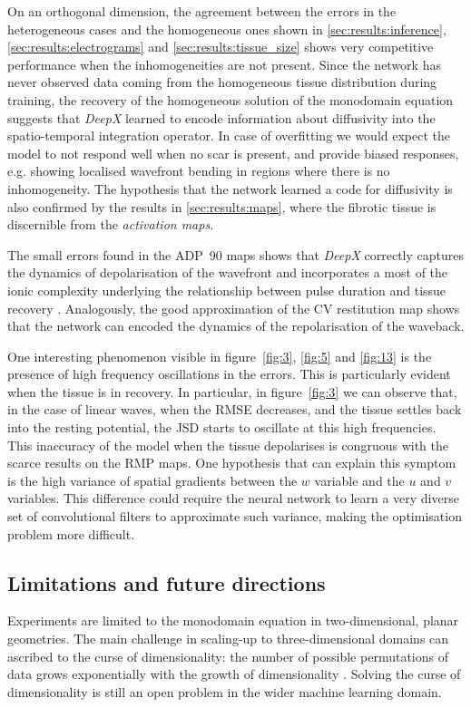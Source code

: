 \documentclass[utf8]{frontiersSCNS} %
\begin{document}
On an orthogonal dimension, the agreement between the errors in the heterogeneous cases and the homogeneous ones shown in \ref{sec:results:inference}, \ref{sec:results:electrograms} and \ref{sec:results:tissue_size} shows very competitive performance when the inhomogeneities are not present.
Since the network has never observed data coming from the homogeneous tissue distribution during training, the recovery of the homogeneous solution of the monodomain equation suggests that \textit{DeepX} learned to encode information about diffusivity into the spatio-temporal integration operator.
In case of overfitting we would expect the model to not respond well when no scar is present, and provide biased responses, e.g. showing localised wavefront bending in regions where there is no inhomogeneity.
The hypothesis that the network learned a code for diffusivity is also confirmed by the results in \ref{sec:results:maps}, where the fibrotic tissue is discernible from the \textit{activation maps}. 


The small errors found in the ADP~90 maps shows that \textit{DeepX} correctly captures the dynamics of depolarisation of the wavefront and incorporates a most of the ionic complexity underlying the relationship between pulse duration and tissue recovery \cite[]{Fenton1998}.
Analogously, the good approximation of the CV restitution map shows that the network can encoded the dynamics of the repolarisation of the waveback.

One interesting phenomenon visible in figure~\ref{fig:3}, \ref{fig:5} and \ref{fig:13} is the presence of high frequency oscillations in the errors.
This is particularly evident when the tissue is in recovery. In particular, in figure~\ref{fig:3} we can observe that, in the case of linear waves, when the RMSE decreases, and the tissue settles back into the resting potential, the JSD starts to oscillate at this high frequencies.
This inaccuracy of the model when the tissue depolarises is congruous with the scarce  results on the RMP maps.
One hypothesis that can explain this symptom is the high variance of spatial gradients between the $w$ variable and the $u$ and $v$ variables. This difference could require the neural network to learn a very diverse set of convolutional filters to approximate such variance, making the optimisation problem more difficult.


\subsection{Limitations and future directions}
\label{sec:discussion:limitations}
Experiments are limited to the monodomain equation in two-dimensional, planar geometries. The main challenge in scaling-up to three-dimensional domains can ascribed to the curse of dimensionality: the number of possible permutations of data grows exponentially with the growth of dimensionality \cite[]{bellman1966dynamic}. Solving the curse of dimensionality is still an open problem in the wider machine learning domain.
\end{document}

